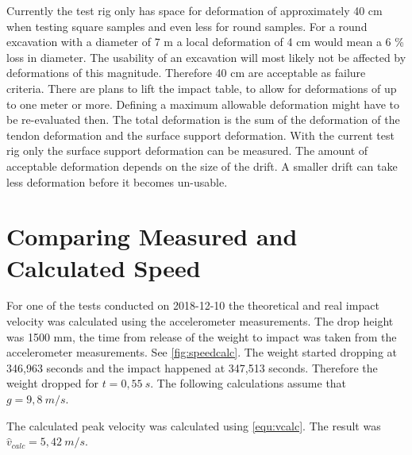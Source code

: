 Currently the test rig only has space for deformation of approximately 40 cm when testing square samples and even less for round samples.
For a round excavation with a diameter of 7 m a local deformation of 4 cm would mean a 6 \% loss in diameter. The usability of an excavation will most likely not be affected by deformations of this magnitude. 
Therefore 40 cm are acceptable as failure criteria. There are plans to lift the impact table, to allow for deformations of up to one meter or more. Defining a maximum allowable deformation might have to be re-evaluated then.
The total deformation is the sum of the deformation of the tendon deformation and the surface support deformation. With the current test rig only the surface support deformation can be measured.
The amount of acceptable deformation depends on the size of the drift. A smaller drift can take less deformation before it becomes un-usable.

\section{Comparing Measured and Calculated Speed}
\label{sec:speed}

For one of the tests conducted on 2018-12-10 the theoretical and real impact velocity was calculated using the accelerometer measurements. The drop height was 1500 mm, the time from release of the weight to impact was taken from the accelerometer measurements. See \autoref{fig:speedcalc}. The weight started dropping at 346,963 seconds and the impact happened at 347,513 seconds. Therefore the weight dropped for \( t = 0,55~s \). The following calculations assume that \( g = 9,8~m/s \). 

The calculated peak velocity was calculated using \autoref{equ:vcalc}. The result was \( \hat{v}_{calc} = 5,42~m/s \).

